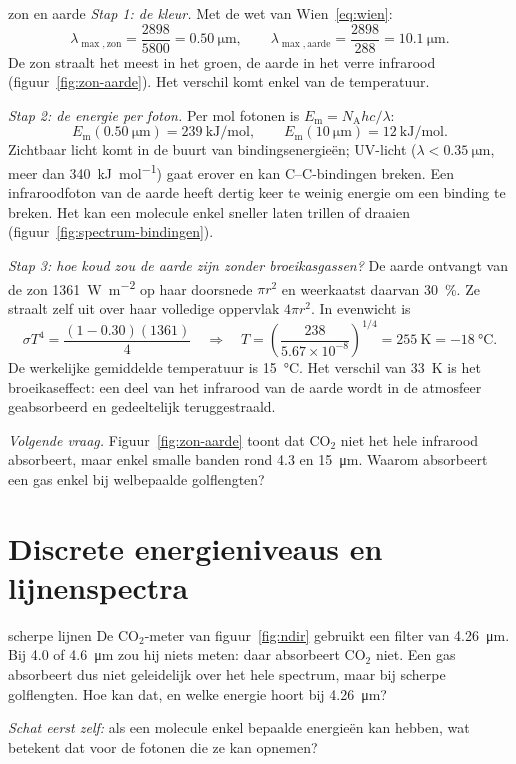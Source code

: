 \begin{casusuitgewerkt}{zon en aarde}
\emph{Stap 1: de kleur.} Met de wet van Wien~\eqref{eq:wien}:
\[
\lambda_{\max,\text{zon}} = \frac{2898}{5800} = \SI{0.50}{\micro\metre}, \qquad
\lambda_{\max,\text{aarde}} = \frac{2898}{288} = \SI{10.1}{\micro\metre}.
\]
De zon straalt het meest in het groen, de aarde in het verre infrarood (figuur~\ref{fig:zon-aarde}). Het verschil komt enkel van de temperatuur.

\emph{Stap 2: de energie per foton.} Per mol fotonen is $E_\mathrm{m} = N_\mathrm{A}hc/\lambda$:
\[
E_\mathrm{m}(\SI{0.50}{\micro\metre}) = \SI{239}{\kilo\joule\per\mole}, \qquad
E_\mathrm{m}(\SI{10}{\micro\metre}) = \SI{12}{\kilo\joule\per\mole}.
\]
Zichtbaar licht komt in de buurt van bindingsenergieën; UV-licht ($\lambda < \SI{0.35}{\micro\metre}$, meer dan \SI{340}{\kilo\joule\per\mole}) gaat erover en kan C--C-bindingen breken. Een infraroodfoton van de aarde heeft dertig keer te weinig energie om een binding te breken. Het kan een molecule enkel sneller laten trillen of draaien (figuur~\ref{fig:spectrum-bindingen}).

\emph{Stap 3: hoe koud zou de aarde zijn zonder broeikasgassen?} De aarde ontvangt van de zon \SI{1361}{\watt\per\metre\squared} op haar doorsnede $\pi r^2$ en weerkaatst daarvan \SI{30}{\percent}. Ze straalt zelf uit over haar volledige oppervlak $4\pi r^2$. In evenwicht is
\[
\sigma T^4 = \frac{(1-0.30)(1361)}{4}
\quad\Longrightarrow\quad
T = \left(\frac{238}{5.67\times10^{-8}}\right)^{1/4} = \SI{255}{\kelvin} = \SI{-18}{\celsius}.
\]
De werkelijke gemiddelde temperatuur is \SI{15}{\celsius}. Het verschil van \SI{33}{\kelvin} is het broeikaseffect: een deel van het infrarood van de aarde wordt in de atmosfeer geabsorbeerd en gedeeltelijk teruggestraald.

\emph{Volgende vraag.} Figuur~\ref{fig:zon-aarde} toont dat CO$_2$ niet het hele infrarood absorbeert, maar enkel smalle banden rond \SI{4.3}{} en \SI{15}{\micro\metre}. Waarom absorbeert een gas enkel bij welbepaalde golflengten?
\end{casusuitgewerkt}

\section{Discrete energieniveaus en lijnenspectra}
\label{sec:lijnenspectra}

\begin{casus}{scherpe lijnen}
De CO$_2$-meter van figuur~\ref{fig:ndir} gebruikt een filter van \SI{4.26}{\micro\metre}. Bij \SI{4.0}{} of \SI{4.6}{\micro\metre} zou hij niets meten: daar absorbeert CO$_2$ niet. Een gas absorbeert dus niet geleidelijk over het hele spectrum, maar bij scherpe golflengten. Hoe kan dat, en welke energie hoort bij \SI{4.26}{\micro\metre}?

\emph{Schat eerst zelf:} als een molecule enkel bepaalde energieën kan hebben, wat betekent dat voor de fotonen die ze kan opnemen?
\end{casus}


